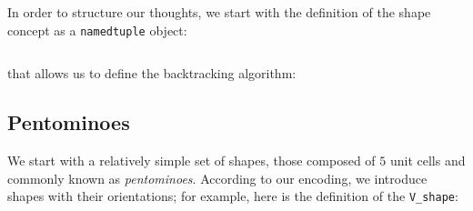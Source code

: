 
In order to structure our thoughts, we start with the definition of the shape
concept as a \verb|namedtuple| object:
\inputminted[fontsize=\small,stripnl=false,firstline=4, lastline=6]{python}{backtracking/polyominoes.py}
that allows us to define the backtracking algorithm:


\subsection{Pentominoes}

We start with a relatively simple set of shapes, those composed of $5$ unit cells
and commonly known as \textit{pentominoes}.
According to our encoding, we introduce shapes with their orientations;
for example, here is the definition of the \verb|V_shape|:
\inputminted[fontsize=\small,stripnl=false,firstline=193, lastline=205]{python}{backtracking/polyominoes.py}

